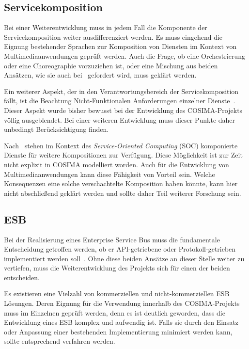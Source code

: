 
\subsection{Servicekomposition} %
\label{sub:servicekomposition_fragen}

  Bei einer Weiterentwicklung muss in jedem Fall die Komponente der Servicekomposition weiter ausdifferenziert werden. Es muss eingehend die Eignung bestehender Sprachen zur Komposition von Diensten im Kontext von Multimediaanwendungen geprüft werden. Auch die Frage, ob eine Orchestrierung oder eine Choreographie vorzuziehen ist, oder eine Mischung aus beiden Ansätzen, wie sie auch bei~\citep{papazoglou2007soc} gefordert wird, muss geklärt werden.
  
  Ein weiterer Aspekt, der in den Verantwortungsbereich der Servicekomposition fällt, ist die Beachtung Nicht-Funktionalen Anforderungen einzelner Dienste~\citep[S. 42]{papazoglou2007soc}. Dieser Aspekt wurde bisher bewusst bei der Entwicklung des COSIMA-Projekts völlig ausgeblendet. Bei einer weiteren Entwicklung muss dieser Punkte daher unbedingt Berücksichtigung finden.

  Nach~\citep[S. 8]{service_oriented_computing} stehen im Kontext des \emph{Service-Oriented Computing} (SOC) komponierte Dienste für weitere Kompositionen zur Verfügung. Diese Möglichkeit ist zur Zeit nicht explizit in COSIMA modelliert worden. Auch für die Entwicklung von Multimediaanwendungen kann diese Fähigkeit von Vorteil sein. Welche Konsequenzen eine solche verschachtelte Komposition haben könnte, kann hier nicht abschließend geklärt werden und sollte daher Teil weiterer Forschung sein.


\subsection{ESB} %
\label{sub:esb_fragen}

  Bei der Realisierung eines Enterprise Service Bus muss die fundamentale Entscheidung getroffen werden, ob er API-getriebene oder Protokoll-getrieben implementiert werden soll~\citep[S. 59]{soa_in_practice}. Ohne diese beiden Ansätze an dieser Stelle weiter zu vertiefen, muss die Weiterentwicklung des Projekts sich für einen der beiden entscheiden.
  
  Es existieren eine Vielzahl von kommerziellen und nicht-kommerziellen ESB Lösungen. Deren Eignung für die Verwendung innerhalb des COSIMA-Projekts muss im Einzelnen geprüft werden, denn es ist deutlich geworden, dass die Entwicklung eines ESB komplex und aufwendig ist. Falls sie durch den Einsatz oder Anpassung einer bestehenden Implementierung minimiert werden kann, sollte entsprechend verfahren werden.



